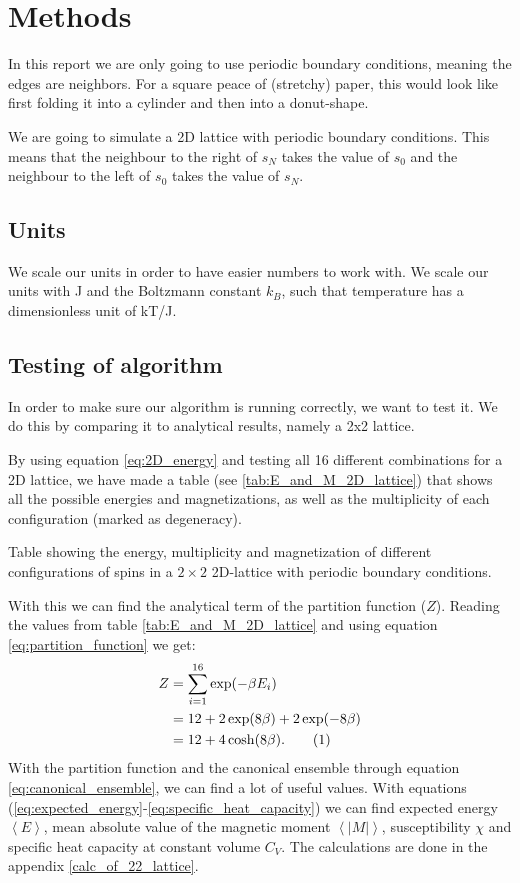 \documentclass[reprint, english,notitlepage,nofootinbib]{revtex4-1}  %
\newcommand\numberthis{\addtocounter{equation}{1}\tag{\theequation}}
\begin{document}
\section{Methods}

In this report we are only going to use periodic boundary conditions, meaning the edges are neighbors. For a square peace of (stretchy) paper, this would look like first folding it into a cylinder and then into a donut-shape.

We are going to simulate a 2D lattice with periodic boundary conditions. This means that the neighbour to the right of $s_N$ takes the value of $s_0$ and the neighbour to the left of $s_0$ takes the value of $s_N$.

\subsection{Units}

We scale our units in order to have easier numbers to work with. We scale our units with J and the Boltzmann constant $k_B$, such that temperature has a dimensionless unit of kT/J.

\subsection{Testing of algorithm}

In order to make sure our algorithm is running correctly, we want to test it. We do this by comparing it to analytical results, namely a 2x2 lattice.

By using equation \eqref{eq:2D_energy} and testing all 16 different combinations for a 2D lattice, we have made a table (see \ref{tab:E_and_M_2D_lattice}) that shows all the possible energies and magnetizations, as well as the multiplicity of each configuration (marked as degeneracy).
\begin{table}[h]
	
	\caption{Table showing the energy, multiplicity and magnetization of different configurations of spins in a $2 \times 2$ 2D-lattice with periodic boundary conditions.}
	\label{tab:E_and_M_2D_lattice}
\end{table}
With this we can find the analytical term of the partition function ($Z$). Reading the values from table \ref{tab:E_and_M_2D_lattice} and using equation \eqref{eq:partition_function} we get:
\begin{align*}
Z &= \sum_{i = 1}^{16} \exp(-\beta E_i) \\
&= 12 + 2\exp(8\beta) + 2\exp(-8\beta) \\
&= 12 + 4\cosh(8\beta). \numberthis \label{eq:2Dpartition_function}
\end{align*}
With the partition function and the canonical ensemble through equation \eqref{eq:canonical_ensemble}, we can find a lot of useful values. With equations (\ref{eq:expected_energy}-\ref{eq:specific_heat_capacity}) we can find expected energy $\left<E\right	>$, mean absolute value of the magnetic moment $\left<|M|\right>$, susceptibility $\chi$ and specific heat capacity at constant volume $C_V$. The calculations are done in the appendix \ref{calc_of_22_lattice}.
\end{document}
